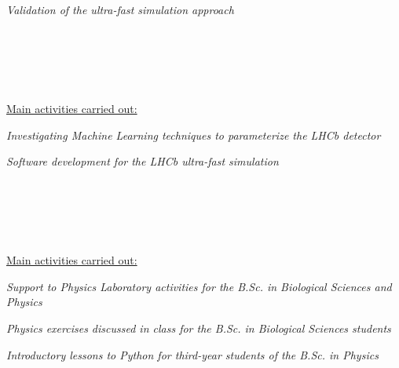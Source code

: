 \begin{cvcontent}
{\begin{itemize*}[label=\textcolor{iconcolor}{\textbullet}]
    \item \emph{Validation of the ultra-fast simulation approach}
  \end{itemize*}}
  \\ [4mm]
  \\ [0.5mm]
  \\ [1.5mm]
  \\ [1.5mm]
  {\normalsize \color{maincolor} \ul{Main activities carried out:}\\ [1.5mm]
  \begin{itemize*}[label=\textcolor{iconcolor}{\textbullet}]
    \item \emph{Investigating Machine Learning techniques to 
      parameterize the LHCb detector}\\ [0.5mm]
    \item \emph{Software development for the LHCb ultra-fast simulation}
  \end{itemize*}}
  \\ [4mm]
  \\ [0.5mm]
  \\ [1.5mm]
  \\ [1.5mm]
  {\normalsize \color{maincolor} \ul{Main activities carried out:}\\ [1.5mm]
  \begin{itemize*}[label=\textcolor{iconcolor}{\textbullet}]
    \item \emph{Support to Physics Laboratory activities for 
      the B.Sc. in Biological Sciences and Physics}\\ [0.5mm]
    \item \emph{Physics exercises discussed in class for the 
      B.Sc. in Biological Sciences students}\\ [0.5mm]
    \item \emph{Introductory lessons to Python for third-year 
      students of the B.Sc. in Physics}
  \end{itemize*}}
  \newpage\noindent

\end{cvcontent}

